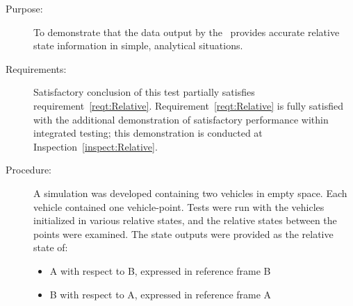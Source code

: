 \begin{description}
\item[Purpose:]
To demonstrate that the data output by the \RelativeDesc\ provides accurate relative state information in simple, analytical  situations.

\item[Requirements:]
Satisfactory conclusion of this test partially satisfies requirement~\ref{reqt:Relative}.  Requirement~\ref{reqt:Relative} is fully satisfied with the additional demonstration of satisfactory performance within integrated testing; this demonstration is conducted at Inspection~\ref{inspect:Relative}.

\item[Procedure:]
A simulation was developed containing two vehicles in empty space.  Each vehicle
contained one vehicle-point.  Tests were run with the vehicles initialized in
various relative states, and the relative states between the points were
examined.  The state outputs were provided as the relative state of:
\begin{itemize}
 \item A with respect to B, expressed in reference frame B
 \item B with respect to A, expressed in reference frame A
\end{itemize}


\end{description}
